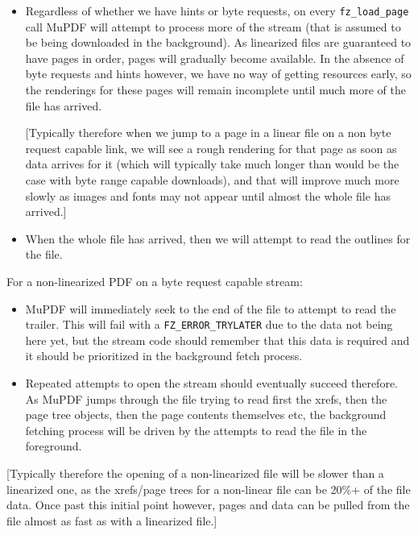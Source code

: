 \documentclass[oneside]{book}
\begin{document}
\begin{itemize}
\begin{itemize}
[Typically therefore when we jump to a page in a linear file on a byte request capable link, we will quickly see a rough rendering, which will improve fairly fast as images and fonts arrive.]

\item
Regardless of whether we have hints or byte requests, on every \texttt{fz\_load\_page} call MuPDF will attempt to process more of the stream (that is assumed to be being downloaded in the background). As linearized files are guaranteed to have pages in order, pages will gradually become available. In the absence of byte requests and hints however, we have no way of getting resources early, so the renderings for these pages will remain incomplete until much more of the file has arrived.

[Typically therefore when we jump to a page in a linear file on a non byte request capable link, we will see a rough rendering for that page as soon as data arrives for it (which will typically take much longer than would be the case with byte range capable downloads), and that will improve much more slowly as images and fonts may not appear until almost the whole file has arrived.]

\item
When the whole file has arrived, then we will attempt to read the outlines for the file.
\end{itemize}

For a non-linearized PDF on a byte request capable stream:

\begin{itemize}
\item
MuPDF will immediately seek to the end of the file to attempt to read the trailer. This will fail with a \texttt{FZ\_ERROR\_TRYLATER} due to the data not being here yet, but the stream code should remember that this data is required and it should be prioritized in the background fetch process.

\item
Repeated attempts to open the stream should eventually succeed therefore. As MuPDF jumps through the file trying to read first the xrefs, then the page tree objects, then the page contents themselves etc, the background fetching process will be driven by the attempts to read the file in the foreground.
\end{itemize}

[Typically therefore the opening of a non-linearized file will be slower than a linearized one, as the xrefs/page trees for a non-linear file can be 20\%+ of the file data. Once past this initial point however, pages and data can be pulled from the file almost as fast as with a linearized file.]


\end{itemize}
\end{document}
